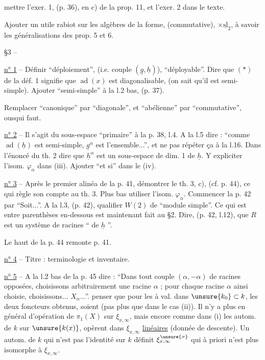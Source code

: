 mettre l'exer. 1, (p. 36), en c) de la prop. 11, et l'exer. 2 dans le texte.

Ajouter un utile rabiot sur les algèbres de la forme, (commutative), $\times\underline{\mathrm{sl}}_2$, à savoir les généralisations des prop. 5 et 6.

\S 3 -- 

\uline{n° 1} -- Définir ``déploiement'', (i.e. couple $(\underline g,\underline h)$), ``déployable''. Dire que $(*)$ de la déf. 1 signifie que $\operatorname{ad}(x)$ est diagonalisable, (on sait qu'il est semi-simple). Ajouter ``semi-simple'' à la l.2 bas, (p. 37).

Remplacer ``canonique'' par ``diagonale'', et ``abélienne'' par ``commutative'', ousqui faut.

\uline{n° 2} -- Il s'agit du sous-espace ``primaire'' à la p. 38, l.4. A la l.5 dire : ``comme $\operatorname{ad}(\underline h)$ est semi-simple, $\underline g^\alpha$ est l'ensemble...'', et ne pas répéter ça à la l.16. Dans l'énoncé du th. 2 dire que $\underline h^\alpha$ est un sous-espace de dim. 1 de $\underline h$. Y expliciter l'isom. $\varphi_\alpha$ dans (iii). Ajouter ``et si'' dans le (iv).

\uline{n° 3} -- Après le premier alinéa de la p. 41, démontrer le th. 3, c), (cf. p. 44), ce qui règle son compte au th. 3. Plus bas utiliser l'isom. $\varphi_\alpha$. Commencer la p. 42 par ``Soit...''. A la l.3, (p. 42), qualifier $W(2)$ de ``module simple''. Ce qui est entre parenthèses en-dessous est maintenant fait au \S 2. Dire, (p. 42, l.12), que $R$ est un système de racines `` de $\underline h$ ''.

Le haut de la p. 44 remonte p. 41.

\uline{n° 4} -- Titre : terminologie et inventaire.

\uline{n° 5} -- A la l.2 bas de la p. 45 dire : ``Dans tout couple $(\alpha,-\alpha)$ de racines opposées, choisissons arbitrairement une racine $\alpha$ ; pour chaque racine $\alpha$ ainsi choisie, choisissons... $X_\alpha$...''.
penser que pour les  à val. dans $\unsure{k_0}\subset k$, les deux foncteurs obtenus, soient  (pas plus que dans le cas (ii)). Il n'y a plus en général d'opération de $\pi_1(X)$ sur $\xi_{x,\infty}$, mais encore comme dans (i) les autom. de $k$ sur $\unsure{k(x)}$, opèrent dans $\xi_{x,\infty}$  \uline{linéaires} (donnée de descente). Un autom. de $k$ qui n'est pas l'identité sur $k$ définit $\xi_{x,\infty}^{\unsure{\sigma}}$ qui à priori n'est plus isomorphe à $\xi_{x,\infty}$.

